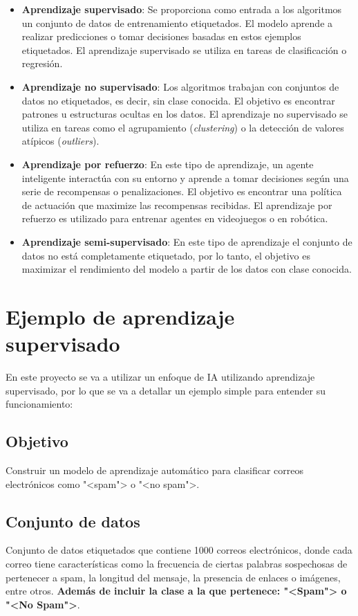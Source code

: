 \begin{itemize}
\item \textbf{Aprendizaje supervisado}: Se proporciona como entrada a los algoritmos un conjunto de datos de entrenamiento etiquetados. El modelo aprende a realizar predicciones o tomar decisiones basadas en estos ejemplos etiquetados. El aprendizaje supervisado se utiliza en tareas de clasificación o regresión.

\item \textbf{Aprendizaje no supervisado}: Los algoritmos trabajan con conjuntos de datos no etiquetados, es decir, sin clase conocida. El objetivo es encontrar patrones u estructuras ocultas en los datos. El aprendizaje no supervisado se utiliza en tareas como el agrupamiento (\textit{clustering}) o la detección de valores atípicos (\emph{outliers}).

\item \textbf{Aprendizaje por refuerzo}: En este tipo de aprendizaje, un agente inteligente interactúa con su entorno y aprende a tomar decisiones según una serie de recompensas o penalizaciones. El objetivo es encontrar una política de actuación que maximize las recompensas recibidas. El aprendizaje por refuerzo es utilizado para entrenar agentes en videojuegos o en robótica. \cite{sutton2018reinforcement}

\item \textbf{Aprendizaje semi-supervisado}: En este tipo de aprendizaje el conjunto de datos no está completamente etiquetado, por lo tanto, el objetivo es maximizar el rendimiento del modelo a partir de los datos con clase conocida. \cite{chapelle2006ssl}
\end{itemize}

\section{Ejemplo de aprendizaje supervisado}

En este proyecto se va a utilizar un enfoque de IA utilizando aprendizaje supervisado, por lo que se va a detallar un ejemplo simple para entender su funcionamiento: \cite{DADA2019e01802}

\subsection{Objetivo}
Construir un modelo de aprendizaje automático para clasificar correos electrónicos como "<spam"> o "<no spam">.

\subsection{Conjunto de datos}
Conjunto de datos etiquetados que contiene 1000 correos electrónicos, donde cada correo tiene características como la frecuencia de ciertas palabras sospechosas de pertenecer a spam, la longitud del mensaje, la presencia de enlaces o imágenes, entre otros. \textbf{Además de incluir la clase a la que pertenece: "<Spam"> o "<No Spam">}.

